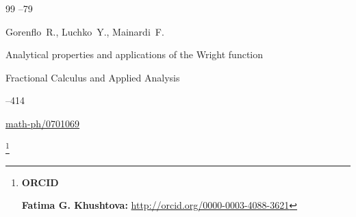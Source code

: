 \begin{thebibliography}{99}
--79







\by Gorenflo~R., Luchko~Y., Mainardi~F.

\paper Analytical properties and applications of the Wright  function

\jour Fractional Calculus and Applied Analysis




--414

\arxiv \href{http://arxiv.org/abs/math-ph/0701069}{math-ph/0701069}





\end{thebibliography}



\RuDate









\newpage



\makeentitle





\thanks{{\bf ORCID}



{\bf Fatima G. Khushtova:}    \url{http://orcid.org/0000-0003-4088-3621}



}





\EngRef





